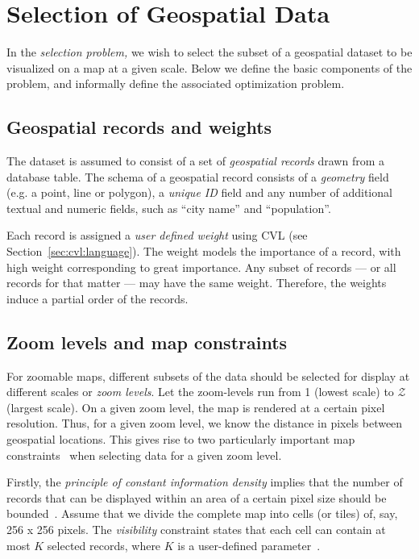 \documentclass[11pt, oneside]{report}
\begin{document}
{\section{Selection of Geospatial Data}
\label{sec:cvl:background}

In the \emph{selection problem,} we wish to select the subset of a geospatial dataset to be visualized on a map at a given scale. Below we define the basic components of the problem, and informally define the associated optimization problem.

\subsection{Geospatial records and weights}
\label{sec:cvl:records}

The dataset is assumed to consist of a set of \emph{geospatial records} drawn from a database table. The schema of a geospatial record consists of a \emph{geometry} field (e.g. a point, line or polygon), a \emph{unique ID} field and any number of additional textual and numeric fields, such as ``city name'' and ``population''.

Each record is assigned a \emph{user defined weight} using CVL (see Section~\ref{sec:cvl:language}). The weight models the importance of a record, with high weight corresponding to great importance. Any subset of records --- or all records for that matter --- may have the same weight. Therefore, the weights induce a partial order of the records.

\subsection{Zoom levels and map constraints}
\label{sec:cvl:constraints}
For zoomable maps, different subsets of the data should be selected for display at different scales or \emph{zoom levels}. Let the zoom-levels run from 1 (lowest scale) to $\mathcal{Z}$ (largest scale). On a given zoom level, the map is rendered at a certain pixel resolution. Thus, for a given zoom level, we know the distance in pixels between geospatial locations. This gives rise to two particularly important map constraints~\cite{harrie2007modelling} when selecting data for a given zoom level.

Firstly, the \emph{principle of constant information density} implies that the number of records that can be displayed within an area of a certain pixel size should be bounded~\cite{topfer1966principles}. Assume that we divide the complete map into cells (or tiles) of, say, 256 x 256 pixels. The \emph{visibility} constraint states that each cell can contain at most $K$ selected records, where $K$ is a user-defined parameter~\cite{sarma2012fusiontables}.

}
\end{document}
